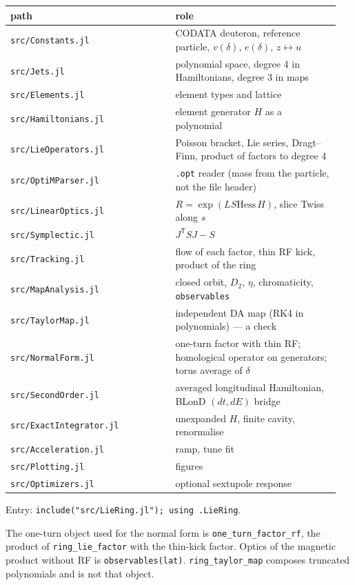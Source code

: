 \documentclass[11pt,a4paper]{article}
\begin{document}
\begin{center}\small\begin{tabular}{p{0.475\linewidth}p{0.475\linewidth}}\hline
\textbf{path} & \textbf{role}\\\hline
\texttt{src/Constants.jl} & CODATA deuteron, reference particle, $v(\delta)$, $e(\delta)$, $z\leftrightarrow u$\\
\texttt{src/Jets.jl} & polynomial space, degree 4 in Hamiltonians, degree 3 in maps\\
\texttt{src/Elements.jl} & element types and lattice\\
\texttt{src/Hamiltonians.jl} & element generator $H$ as a polynomial\\
\texttt{src/LieOperators.jl} & Poisson bracket, Lie series, Dragt–Finn, product of factors to degree 4\\
\texttt{src/OptiMParser.jl} & \texttt{.opt} reader (mass from the particle, not the file header)\\
\texttt{src/LinearOptics.jl} & $R=\exp(L S \mathrm{Hess}\,H)$, slice Twiss along $s$\\
\texttt{src/Symplectic.jl} & $J^\mathsf{T}SJ-S$\\
\texttt{src/Tracking.jl} & flow of each factor, thin RF kick, product of the ring\\
\texttt{src/MapAnalysis.jl} & closed orbit, $D_2$, $\eta$, chromaticity, \texttt{observables}\\
\texttt{src/TaylorMap.jl} & independent DA map (RK4 in polynomials) — a check\\
\texttt{src/NormalForm.jl} & one-turn factor with thin RF; homological operator on generators; torus average of $\delta$\\
\texttt{src/SecondOrder.jl} & averaged longitudinal Hamiltonian, BLonD $(dt,dE)$ bridge\\
\texttt{src/ExactIntegrator.jl} & unexpanded $H$, finite cavity, renormalise\\
\texttt{src/Acceleration.jl} & ramp, tune fit\\
\texttt{src/Plotting.jl} & figures\\
\texttt{src/Optimizers.jl} & optional sextupole response\\
\hline\end{tabular}\end{center}

Entry: \texttt{include("src/LieRing.jl"); using .LieRing}.

The one-turn object used for the normal form is \texttt{one\_turn\_factor\_rf}, the
product of \texttt{ring\_lie\_factor} with the thin-kick factor. Optics of the
magnetic product without RF is \texttt{observables(lat)}. \texttt{ring\_taylor\_map}
composes truncated polynomials and is not that object.
\end{document}
